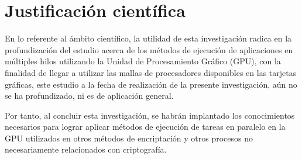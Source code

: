 \documentclass[../main/main.tex]{subfiles}
\begin{document}
  \section{Justificación científica}

  En lo referente al ámbito científico, la utilidad de esta investigación radica en la profundización del estudio acerca de los métodos de ejecución de aplicaciones en múltiples hilos utilizando la Unidad de Procesamiento Gráfico (GPU), con la finalidad de llegar a utilizar las mallas de procesadores disponibles en las tarjetas gráficas, este estudio a la fecha de realización de la presente investigación, aún no se ha profundizado, ni es de aplicación general.

  Por tanto, al concluir esta investigación, se habrán implantado los conocimientos necesarios para lograr aplicar métodos de ejecución de tareas en paralelo en la GPU utilizados en otros métodos de encriptación y otros procesos no necesariamente relacionados con criptografía.

  \printbibliography
\end{document}

